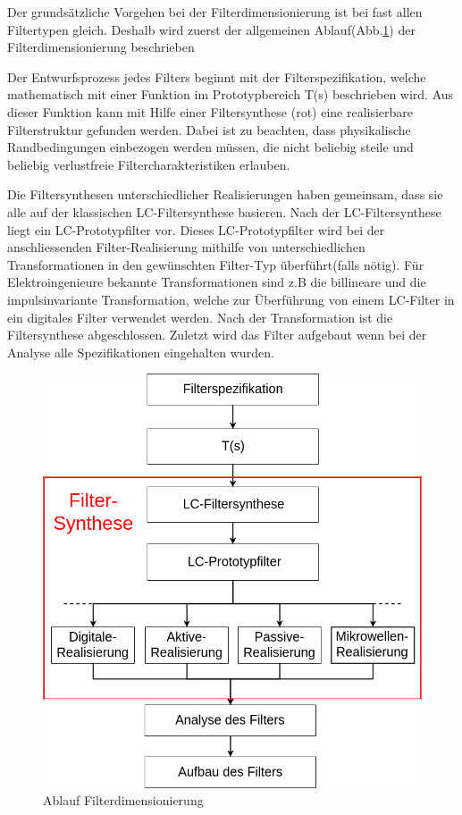 Der grundsätzliche Vorgehen bei der Filterdimensionierung ist bei fast allen Filtertypen gleich. Deshalb wird zuerst der allgemeinen Ablauf(Abb.\ref{fig:Ablauf_Filterdimensionierung_Allgemein}) der Filterdimensionierung beschrieben 

Der Entwurfsprozess jedes Filters beginnt mit der Filterspezifikation, welche mathematisch mit einer Funktion im Prototypbereich T(s) beschrieben wird. Aus dieser Funktion kann mit Hilfe einer Filtersynthese (rot) eine realisierbare Filterstruktur gefunden werden. Dabei ist zu beachten, dass  physikalische Randbedingungen einbezogen werden müssen, die nicht beliebig steile und beliebig verlustfreie Filtercharakteristiken erlauben.

Die Filtersynthesen unterschiedlicher Realisierungen haben gemeinsam, dass sie alle auf der klassischen LC-Filtersynthese basieren. Nach der LC-Filtersynthese liegt ein LC-Prototypfilter vor. Dieses LC-Prototypfilter wird bei der anschliessenden Filter-Realisierung mithilfe von unterschiedlichen Transformationen in den gewünschten Filter-Typ überführt(falls nötig). Für Elektroingenieure bekannte Transformationen sind z.B die billineare und die impulsinvariante Transformation, welche zur Überführung von einem LC-Filter in ein digitales Filter verwendet werden. Nach der Transformation ist die Filtersynthese abgeschlossen. Zuletzt wird das Filter aufgebaut wenn bei der Analyse alle Spezifikationen eingehalten wurden.

\begin{figure}[h!]
\centering
 	\includegraphics[width=\imagewidth]{images/Ablauf_Filterdimensionierung_Allgemein.png}
 	\caption{Ablauf Filterdimensionierung}
 	\label{fig:Ablauf_Filterdimensionierung_Allgemein}
\end{figure}

